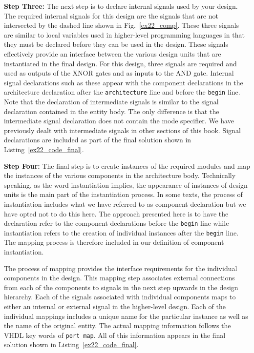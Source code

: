 \noindent
\textbf{Step Three:} The next step is to declare internal signals used by your design. The required internal signals for this design are the signals that are not intersected by the dashed line shown in Fig.~\ref{ex22_comp}. These three signals are similar to local variables used in higher-level programming languages in that they must be declared before they can be used in the design. These signals effectively provide an interface between the various design units that are instantiated in the final design. For this design, three signals are required and used as outputs of the XNOR gates and as inputs to the AND gate. Internal signal declarations such as these appear with the component declarations in the architecture declaration after the  \texttt{architecture} line and before the  \texttt{begin} line. Note that the declaration of intermediate signals is similar to the signal declaration contained in the entity body. The only difference is that the intermediate signal declaration does not contain the mode specifier. We have previously dealt with intermediate signals in other sections of this book. Signal declarations are included as part of the final solution shown in Listing~\ref{ex22_code_final}.

\noindent
\textbf{Step Four:} The final step is to create instances of the required modules and map the instances of the various components in the architecture body. Technically speaking, as the word instantiation implies, the appearance of instances of design units is the main part of the instantiation process. In some texts, the process of instantiation includes what we have referred to as component declaration but we have opted not to do this here. The approach presented here is to have the declaration refer to the component declarations before the \texttt{begin} line while instantiation refers to the creation of individual instances after the \texttt{begin} line. The mapping process is therefore included in our definition of component instantiation.

The process of mapping provides the interface requirements for the individual components in the design. This mapping step associates external connections from each of the components to signals in the next step upwards in the design hierarchy. Each of the signals associated with individual components maps to either an internal or external signal in the higher-level design. Each of the individual mappings includes a unique name for the particular instance as well as the name of the original entity. The actual mapping information follows the VHDL key words of \texttt{port map}. All of this information appears in the final solution shown in Listing~\ref{ex22_code_final}.

